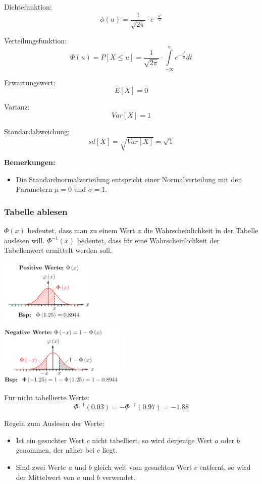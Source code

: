 \documentclass[10pt,a4paper,twocolumn]{article}
\begin{document}
Dichtefunktion:
\[
\phi(u)=\frac{1}{\sqrt{2\pi}}\cdot e^{-\frac{u^2}{2}}
\]

Verteilungsfunktion:
\[
\Phi(u)=P[X \leq u]=\frac{1}{\sqrt{2\pi}}\cdot\int \limits_{-\infty}^u e^{-\frac{t^2}{2}}dt
\]

Erwartungswert:
\[
E[X]=0
\]

Varianz:
\[
Var[X]=1
\]

Standardabweichung:
\[
sd[X]=\sqrt{Var[X]}=\sqrt{1}
\]

\textbf{Bemerkungen:}
\begin{itemize}
\item Die Standardnormalverteilung entspricht einer Normalverteilung mit den Parametern $\mu = 0$ und $\sigma = 1$.
\end{itemize}

\subsubsection{Tabelle ablesen}
$\Phi(x)$ bedeutet, dass man zu einem Wert $x$ die Wahrscheinlichkeit in der Tabelle auslesen will. $\Phi^{-1}(x)$ bedeutet, dass für eine Wahrscheinlichkeit der Tabellenwert ermittelt werden soll.

\begin{center}
\includegraphics[width=45mm]{standardnormalverteilung_tabelle1.png}
\end{center}
\begin{center}
\includegraphics[width=60mm]{standardnormalverteilung_tabelle2.png}
\end{center}

Für nicht tabellierte Werte:
\[
\Phi^{-1}(0.03)=-\Phi^{-1}(0.97)=-1.88
\]

Regeln zum Auslesen der Werte:
\begin{itemize}
\item Ist ein gesuchter Wert $c$ nicht tabelliert, so wird derjenige Wert $a$ oder $b$ genommen, der näher bei $c$ liegt.
\item Sind zwei Werte $a$ und $b$ gleich weit vom gesuchten Wert $c$ entfernt, so wird der Mittelwert von $a$ und $b$ verwendet.
\end{itemize}
\end{document}
